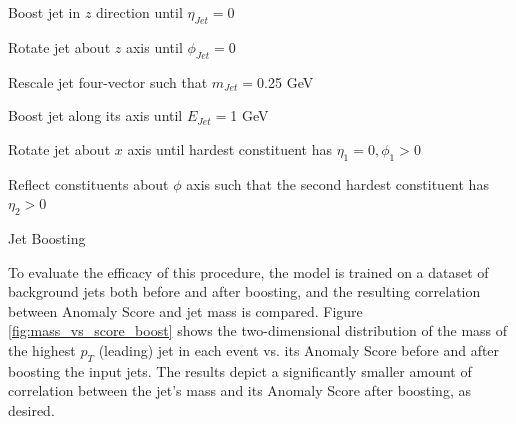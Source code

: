\documentclass[12pt, a4paper]{article}
\begin{document}
\begin{algorithm}[H]
\SetAlgoLined
{}
  \Beginning{}

  Boost jet in $z$ direction until $\eta_{Jet} = 0$
 
  Rotate jet about $z$ axis until $\phi_{Jet} = 0$
 
  Rescale jet four-vector such that $m_{Jet} = $0.25 GeV
 
  Boost jet along its axis until $E_{Jet} = $1 GeV
 
  Rotate jet about $x$ axis until hardest constituent has $\eta_{1} = 0, \phi_{1} > 0$
 
 

 
Reflect constituents about $\phi$ axis such that the second hardest constituent has $\eta_{2} > 0$
 
\caption{Jet Boosting}
\label{alg:boost}
\end{algorithm}





To evaluate the efficacy of this procedure, the model is trained on a dataset of background jets both before and after boosting, and the resulting correlation between Anomaly Score and jet mass is compared. Figure \ref{fig:mass_vs_score_boost} shows the two-dimensional distribution of the mass of the highest $p_T$ (leading) jet in each event vs. its Anomaly Score before and after boosting the input jets. The results depict a significantly smaller amount of correlation between the jet's mass and its Anomaly Score after boosting, as desired.
\end{document}
